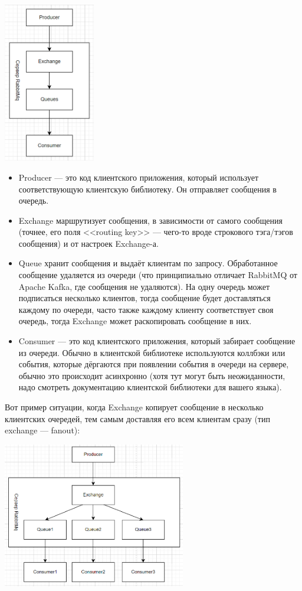 \documentclass{../../text-style}
\begin{document}
\begin{center}
\includegraphics[width=0.3\textwidth]{rabbitMqArchitecture.png}
\end{center}

\begin{itemize}
    \item Producer --- это код клиентского приложения, который использует соответствующую клиентскую библиотеку. Он отправляет сообщения в очередь. 
    \item Exchange маршрутизует сообщения, в зависимости от самого сообщения (точнее, его поля <<routing key>> --- чего-то вроде строкового тэга/тэгов сообщения) и от настроек Exchange-а.
    \item Queue хранит сообщения и выдаёт клиентам по запросу. Обработанное сообщение удаляется из очереди (что принципиально отличает RabbitMQ от Apache Kafka, где сообщения не удаляются). На одну очередь может подписаться несколько клиентов, тогда сообщение будет доставляться каждому по очереди, часто также каждому клиенту соответствует своя очередь, тогда Exchange может раскопировать сообщение в них.
    \item Consumer --- это код клиентского приложения, который забирает сообщение из очереди. Обычно в клиентской библиотеке используются коллбэки или события, которые дёргаются при появлении события в очереди на сервере, обычно это происходит асинхронно (хотя тут могут быть неожиданности, надо смотреть документацию клиентской библиотеки для вашего языка).
\end{itemize}

Вот пример ситуации, когда Exchange копирует сообщение в несколько клиентских очередей, тем самым доставляя его всем клиентам сразу (тип exchange --- fanout):

\begin{center}
    \includegraphics[width=0.6\textwidth]{fanoutExchange.png}
\end{center}
\end{document}
